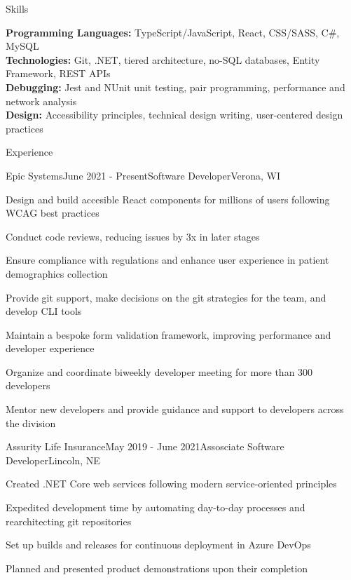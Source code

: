 \documentclass[
	11pt, %
]{resume} %
\begin{document}
\begin{rSection}{Skills}

	\textbf{Programming Languages:} TypeScript/JavaScript, React, CSS/SASS, C\#, MySQL \\
	\textbf{Technologies:} Git, .NET, tiered architecture, no-SQL databases, Entity Framework, REST APIs \\
	\textbf{Debugging:} Jest and NUnit unit testing, pair programming, performance and network analysis \\
	\textbf{Design:} Accessibility principles, technical design writing, user-centered design practices

\end{rSection}

\begin{rSection}{Experience}

	\begin{rSubsection}{Epic Systems}{June 2021 - Present}{Software Developer}{Verona, WI}
		\item Design and build accesible React components for millions of users following WCAG best practices
		\item Conduct code reviews, reducing issues by 3x in later stages
		\item Ensure compliance with regulations and enhance user experience in patient demographics collection
		\item Provide git support, make decisions on the git strategies for the team, and develop CLI tools
		\item Maintain a bespoke form validation framework, improving performance and developer experience
		\item Organize and coordinate biweekly developer meeting for more than 300 developers
		\item Mentor new developers and provide guidance and support to developers across the division
	\end{rSubsection}

	\begin{rSubsection}{Assurity Life Insurance}{May 2019 - June 2021}{Assosciate Software Developer}{Lincoln, NE}
		\item Created .NET Core web services following modern service-oriented principles
		\item Expedited development time by automating day-to-day processes and rearchitecting git repositories
		\item Set up builds and releases for continuous deployment in Azure DevOps
		\item Planned and presented product demonstrations upon their completion
	\end{rSubsection}

\end{rSection}
\end{document}
